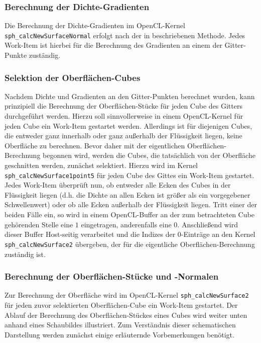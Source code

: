 \subsubsection*{Berechnung der Dichte-Gradienten}
Die Berechnung der Dichte-Gradienten im OpenCL-Kernel {\tt sph\_calcNewSurfaceNormal} erfolgt nach der in \cite[S. 165]{MC} beschriebenen Methode. Jedes Work-Item ist hierbei für die Berechnung des Gradienten an einem der Gitter-Punkte zuständig.
\medskip

\subsubsection*{Selektion der Oberflächen-Cubes}
Nachdem Dichte und Gradienten an den Gitter-Punkten berechnet wurden, kann prinzipiell die Berechnung der Oberflächen-Stücke für jeden Cube des Gitters durchgeführt werden. Hierzu soll sinnvollerweise in einem OpenCL-Kernel für jeden Cube ein Work-Item gestartet werden. Allerdings ist für diejenigen Cubes, die entweder ganz innerhalb oder ganz außerhalb der Flüssigkeit liegen, keine Oberfläche zu berechnen. Bevor daher mit der eigentlichen Oberflächen-Berechnung begonnen wird, werden die Cubes, die tatsächlich von der Oberfläche geschnitten werden, zunächst selektiert. Hierzu wird im Kernel {\tt sph\_calcNewSurface1point5} für jeden Cube des Gittes ein Work-Item gestartet. Jedes Work-Item überprüft nun, ob entweder alle Ecken des Cubes in der Flüssigkeit liegen (d.h. die Dichte an allen Ecken ist größer als ein vorgegebener Schwellenwert) oder ob alle Ecken außerhalb der Flüssigkeit liegen. Tritt einer der beiden Fälle ein, so wird in einem OpenCL-Buffer an der zum betrachteten Cube gehörenden Stelle eine $1$ eingetragen, anderenfalls eine $0$. Anschließend wird dieser Buffer Host-seitig verarbeitet und die Indizes der $0$-Einträge an den Kernel {\tt sph\_calcNewSurface2} übergeben, der für die eigentliche Oberflächen-Berechnung zuständig ist.
\medskip

\subsubsection*{Berechnung der Oberflächen-Stücke und -Normalen}
Zur Berechnung der Oberfläche wird im OpenCL-Kernel {\tt sph\_calcNewSurface2} für jeden zuvor selektierten Oberflächen-Cube ein Work-Item gestartet. Der Ablauf der Berechnung des Oberflächen-Stückes eines Cubes wird weiter unten anhand eines Schaubildes illustriert. Zum Verständnis dieser schematischen Darstellung werden zunächst einige erläuternde Vorbemerkungen benötigt.
\smallskip

